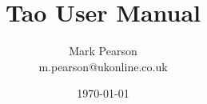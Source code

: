 \documentclass[a4paper,twoside]{report}
\title{Tao User Manual}
\author{Mark Pearson\\
m.pearson@ukonline.co.uk}
\date{\today}
\begin{document}
\maketitle

\renewcommand{\baselinestretch}{1}
\small\normalsize

\T\tableofcontents
\T\listoffigures










\printindex
\end{document}

